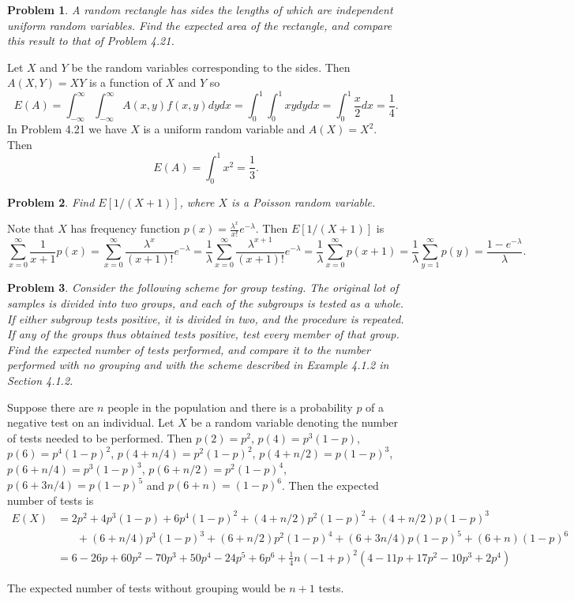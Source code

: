 \documentclass{article}
\newtheorem{problem}{Problem}
\begin{document}
\begin{problem}
A random rectangle has sides the lengths of which are independent uniform random variables. Find the expected area of the rectangle, and compare this result to that of Problem 4.21.
\end{problem}

Let $X$ and $Y$ be the random variables corresponding to the sides. Then $A(X,Y) = XY$ is a function of $X$ and $Y$ so
\[
E(A) = \int_{-\infty}^{\infty} \int_{-\infty}^{\infty} A(x,y)f(x,y)dydx = \int_0^1 \int_0^1 xy dydx = \int_0^1 \frac{x}{2}dx = \frac{1}{4}.
\]
In Problem 4.21 we have $X$ is a uniform random variable and $A(X) = X^2$. Then
\[
E(A) = \int_0^1 x^2 = \frac{1}{3}.
\]

\begin{problem}
Find $E[1/(X+1)]$, where $X$ is a Poisson random variable.
\end{problem}

Note that $X$ has frequency function $p(x) = \frac{\lambda^x}{x!} e^{-\lambda}$. Then $E[1/(X+1)]$ is
\[
\sum_{x=0}^{\infty} \frac{1}{x+1} p(x) = \sum_{x=0}^{\infty} \frac{\lambda^x}{(x+1)!} e^{-\lambda} = \frac{1}{\lambda} \sum_{x=0}^{\infty} \frac{\lambda^{x+1}}{(x+1)!} e^{-\lambda} = \frac{1}{\lambda} \sum_{x=0}^{\infty} p(x+1) = \frac{1}{\lambda} \sum_{y=1}^{\infty} p(y) = \frac{1 - e^{-\lambda}}{\lambda}.
\]

\begin{problem}
Consider the following scheme for group testing. The original lot of samples is divided into two groups, and each of the subgroups is tested as a whole. If either subgroup tests positive, it is divided in two, and the procedure is repeated. If any of the groups thus obtained tests positive, test every member of that group. Find the expected number of tests performed, and compare it to the number performed with no grouping and with the scheme described in Example 4.1.2 in Section 4.1.2.
\end{problem}

Suppose there are $n$ people in the population and there is a probability $p$ of a negative test on an individual. Let $X$ be a random variable denoting the number of tests needed to be performed. Then $p(2) = p^2$, $p(4) = p^3 (1 - p)$, $p(6) = p^4 (1 - p)^2$, $p(4 + n/4) = p^2 (1 - p)^2$, $p(4 + n/2) = p (1 - p)^3$, $p(6 + n/4) = p^3 (1 - p)^3$, $p(6 + n/2) = p^2 (1 - p)^4$, $p(6 + 3n/4) = p(1 - p)^5$ and $p(6 + n) = (1-p)^6$. Then the expected number of tests is
\begin{align*}
E(X)
&= 2p^2 + 4p^3(1-p) + 6p^4(1-p)^2 + (4 + n/2)p^2(1-p)^2 + (4 + n/2)p(1-p)^3\\
&~~~~~~~~+ (6 + n/4)p^3(1-p)^3 + (6 + n/2)p^2(1-p)^4 + (6 + 3n/4)p(1-p)^5 + (6 + n)(1-p)^6\\
&= 6-26 p+60 p^2-70 p^3+50 p^4-24 p^5+6 p^6+\frac{1}{4} n (-1+p)^2 \left(4-11 p+17 p^2-10 p^3+2 p^4\right)
\end{align*}

The expected number of tests without grouping would be $n+1$ tests.
\end{document}
